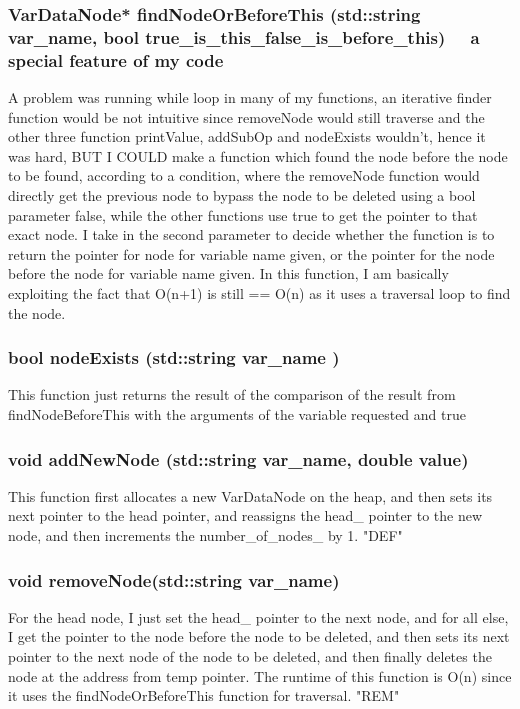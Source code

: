 \documentclass[a4paper]{article}
\begin{document}
    \subsubsection{{\color{orange}VarDataNode*} 
    {\color{draculapurple}findNodeOrBeforeThis}
    ({\color{orange}std::string} var\_name, \newline
    {\color{orange}bool} true\_is\_this\_false\_is\_before\_this)
    \faStar~~{\color{awesome}a special feature of my code}~~\faStar}
    A problem was running while loop in many of my functions, an iterative finder 
    function would be not intuitive since removeNode would still traverse and 
    the other three function {\color{draculapurple}printValue}, {\color{draculapurple}addSubOp} and 
    {\color{draculapurple}nodeExists} wouldn't, hence it was hard, BUT I COULD make a function which found the node before the 
    node to be found, according to a condition, where the removeNode function would 
    directly get the previous node to bypass the node to be deleted using a bool 
    parameter {\color{GoldenYellow}false}, while the other functions use {\color{GoldenYellow}true}
    to get the pointer to that exact node. I take in the second parameter to decide 
    whether the function is to return the pointer for node for variable name given, 
    or the pointer for the node before the node for variable name given.
    In this function, I am basically exploiting the fact that 
    {\color{lightblue}O(n+1) is still == O(n)} as it uses a traversal loop to find the node.
    \subsubsection{{\color{orange}bool} {\color{draculapurple}nodeExists}
    ({\color{orange}std::string} var\_name )}
    This function just returns the result of the comparison of the result from {\color{draculapurple}findNodeBeforeThis} with the arguments of the variable requested and true
    \subsubsection{{\color{orange}void} {\color{draculapurple}addNewNode}
    ({\color{orange}std::string} var\_name, {\color{orange}double} value)}
    This function first allocates a new VarDataNode on the heap, 
    and then sets its next pointer to the head pointer, and reassigns the 
    {\color{LimeGreen}head\_} pointer to the new node, and then increments 
    the {\color{LimeGreen}number\_of\_nodes\_} by 1. "DEF"
    \subsubsection{{\color{orange}void} {\color{draculapurple}removeNode}({\color{orange}std::string} var\_name)}
    For the head node, I just set the {\color{LimeGreen}head\_} pointer to the next node, 
    and for all else, I get the pointer to the node before the node to be deleted, and 
    then sets its next pointer to the next node of the node to be deleted, and then 
    finally deletes the node at the address from temp pointer. The runtime of this 
    function is {\color{lightblue}O(n)} since it uses the {\color{draculapurple}findNodeOrBeforeThis} function for traversal. 
    "REM"
\end{document}
